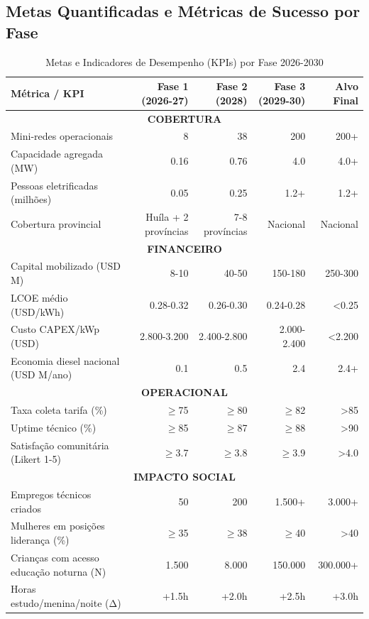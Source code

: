 \documentclass[12pt, a4paper]{article}
\begin{document}
{{{{{{{{{{{{{\subsection{Metas Quantificadas e Métricas de Sucesso por Fase}

\begin{table}[H]
\centering
\caption{Metas e Indicadores de Desempenho (KPIs) por Fase 2026-2030}
\label{tab:kpis}
\small
\begin{tabular}{|l|r|r|r|r|}
\hline
\textbf{Métrica / KPI} & \textbf{Fase 1 (2026-27)} & \textbf{Fase 2 (2028)} & \textbf{Fase 3 (2029-30)} & \textbf{Alvo Final} \\
\hline
\multicolumn{5}{|c|}{\textbf{COBERTURA}} \\
\hline
Mini-redes operacionais & 8 & 38 & 200 & 200+ \\
Capacidade agregada (MW) & 0.16 & 0.76 & 4.0 & 4.0+ \\
Pessoas eletrificadas (milhões) & 0.05 & 0.25 & 1.2+ & 1.2+ \\
Cobertura provincial & Huíla + 2 províncias & 7-8 províncias & Nacional & Nacional \\
\hline
\multicolumn{5}{|c|}{\textbf{FINANCEIRO}} \\
\hline
Capital mobilizado (USD M) & 8-10 & 40-50 & 150-180 & 250-300 \\
LCOE médio (USD/kWh) & 0.28-0.32 & 0.26-0.30 & 0.24-0.28 & <0.25 \\
Custo CAPEX/kWp (USD) & 2.800-3.200 & 2.400-2.800 & 2.000-2.400 & <2.200 \\
Economia diesel nacional (USD M/ano) & 0.1 & 0.5 & 2.4 & 2.4+ \\
\hline
\multicolumn{5}{|c|}{\textbf{OPERACIONAL}} \\
\hline
Taxa coleta tarifa (\%) & $\geq$75 & $\geq$80 & $\geq$82 & >85 \\
Uptime técnico (\%) & $\geq$85 & $\geq$87 & $\geq$88 & >90 \\
Satisfação comunitária (Likert 1-5) & $\geq$3.7 & $\geq$3.8 & $\geq$3.9 & >4.0 \\
\hline
\multicolumn{5}{|c|}{\textbf{IMPACTO SOCIAL}} \\
\hline
Empregos técnicos criados & 50 & 200 & 1.500+ & 3.000+ \\
Mulheres em posições liderança (\%) & $\geq$35 & $\geq$38 & $\geq$40 & >40 \\
Crianças com acesso educação noturna (N) & 1.500 & 8.000 & 150.000 & 300.000+ \\
Horas estudo/menina/noite (Δ) & +1.5h & +2.0h & +2.5h & +3.0h \\
\hline
\end{tabular}
\end{table}

}}}}}}}}}}}}}
\end{document}
